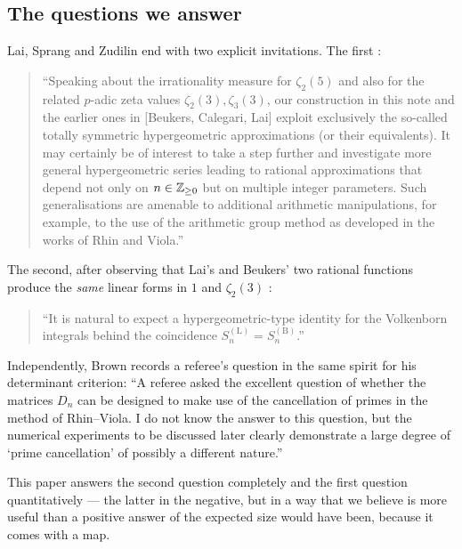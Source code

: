 \subsection{The questions we answer}\label{ss:questions}

Lai, Sprang and Zudilin end \cite{LSZ2025} with two explicit invitations. The first
\cite[Final remarks]{LSZ2025}:

\begin{quote}
``Speaking about the irrationality measure for $\zeta_2(5)$ and also for the related
$p$-adic zeta values $\zeta_2(3),\zeta_3(3)$, our construction in this note and the earlier
ones in [Beukers, Calegari, Lai] exploit exclusively the so-called totally symmetric
hypergeometric approximations (or their equivalents). It may certainly be of interest to
take a step further and investigate more general hypergeometric series leading to rational
approximations that depend not only on $n\in\mathbb{Z}_{\ge0}$ but on multiple integer parameters.
Such generalisations are amenable to additional arithmetic manipulations, for example, to
the use of the arithmetic group method as developed in the works of Rhin and Viola.''
\end{quote}

\noindent The second, after observing that Lai's and Beukers' two rational functions produce
the \emph{same} linear forms in $1$ and $\zeta_2(3)$ \cite[Final remarks]{LSZ2025}:

\begin{quote}
``It is natural to expect a hypergeometric-type identity for the Volkenborn integrals behind
the coincidence $S_n^{(\mathrm L)}=S_n^{(\mathrm B)}$.''
\end{quote}

\noindent Independently, Brown \cite[Rem.~47]{Brown2026} records a referee's question in the
same spirit for his determinant criterion: ``A referee asked the excellent question of
whether the matrices $D_n$ can be designed to make use of the cancellation of primes in the
method of Rhin--Viola. I do not know the answer to this question, but the numerical
experiments to be discussed later clearly demonstrate a large degree of `prime
cancellation' of possibly a different nature.''

This paper answers the second question completely and the first question
quantitatively --- the latter in the negative, but in a way that we believe is more useful
than a positive answer of the expected size would have been, because it comes with a map.


